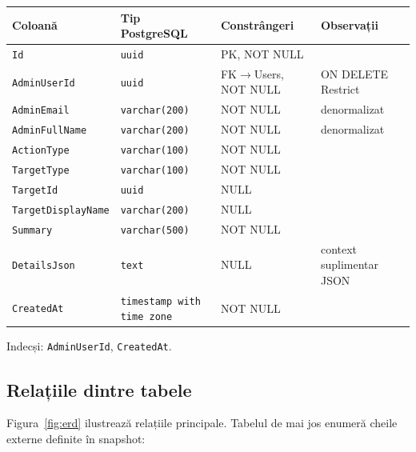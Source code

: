 \begin{tabular}{llll}
\hline
\textbf{Coloană} & \textbf{Tip PostgreSQL} & \textbf{Constrângeri} & \textbf{Observații} \\
\hline
\texttt{Id}                & \texttt{uuid}           & PK, NOT NULL              & \\
\texttt{AdminUserId}       & \texttt{uuid}           & FK$\rightarrow$Users, NOT NULL        & ON DELETE Restrict \\
\texttt{AdminEmail}        & \texttt{varchar(200)}   & NOT NULL                  & denormalizat \\
\texttt{AdminFullName}     & \texttt{varchar(200)}   & NOT NULL                  & denormalizat \\
\texttt{ActionType}        & \texttt{varchar(100)}   & NOT NULL                  & \\
\texttt{TargetType}        & \texttt{varchar(100)}   & NOT NULL                  & \\
\texttt{TargetId}          & \texttt{uuid}           & NULL                      & \\
\texttt{TargetDisplayName} & \texttt{varchar(200)}   & NULL                      & \\
\texttt{Summary}           & \texttt{varchar(500)}   & NOT NULL                  & \\
\texttt{DetailsJson}       & \texttt{text}           & NULL                      & context suplimentar JSON \\
\texttt{CreatedAt}         & \texttt{timestamp with time zone} & NOT NULL        & \\
\hline
\end{tabular}

\medskip
Indecși: \texttt{AdminUserId}, \texttt{CreatedAt}.

\subsection{Relațiile dintre tabele}

Figura~\ref{fig:erd} ilustrează relațiile principale. Tabelul de mai jos
enumeră cheile externe definite în snapshot:

